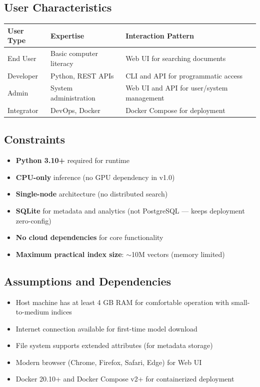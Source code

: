 \documentclass[11pt,a4paper]{article}
\begin{document}
\subsection{User Characteristics}

\begin{longtable}{@{}p{3cm}p{4cm}p{6cm}@{}}
\toprule
\textbf{User Type} & \textbf{Expertise} & \textbf{Interaction Pattern} \\
\midrule
\endhead
End User & Basic computer literacy & Web UI for searching documents \\
Developer & Python, REST APIs & CLI and API for programmatic access \\
Admin & System administration & Web UI and API for user/system management \\
Integrator & DevOps, Docker & Docker Compose for deployment \\
\bottomrule
\end{longtable}

\subsection{Constraints}
\begin{itemize}
    \item \textbf{Python 3.10+} required for runtime
    \item \textbf{CPU-only} inference (no GPU dependency in v1.0)
    \item \textbf{Single-node} architecture (no distributed search)
    \item \textbf{SQLite} for metadata and analytics (not PostgreSQL --- keeps deployment zero-config)
    \item \textbf{No cloud dependencies} for core functionality
    \item \textbf{Maximum practical index size}: $\sim$10M vectors (memory limited)
\end{itemize}

\subsection{Assumptions and Dependencies}
\begin{itemize}
    \item Host machine has at least 4 GB RAM for comfortable operation with small-to-medium indices
    \item Internet connection available for first-time model download
    \item File system supports extended attributes (for metadata storage)
    \item Modern browser (Chrome, Firefox, Safari, Edge) for Web UI
    \item Docker 20.10+ and Docker Compose v2+ for containerized deployment
\end{itemize}
\end{document}
